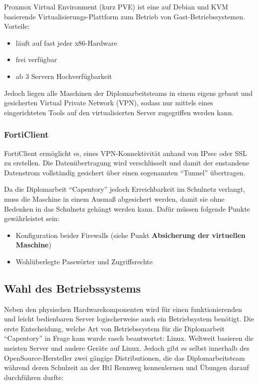 Proxmox Virtual Environment (kurz PVE) ist eine auf Debian und KVM
basierende Virtualisierungs-Plattform zum Betrieb von
Gast-Betriebssystemen. Vorteile:

\begin{itemize}
\tightlist
\item
  läuft auf fast jeder x86-Hardware
\item
  frei verfügbar
\item
  ab 3 Servern Hochverfügbarkeit
\end{itemize}

Jedoch liegen alle Maschinen der Diplomarbeitsteams in einem eigens
gebaut und gesicherten Virtual Private Network (VPN), sodass nur mittels
eines eingerichteten Tools auf den virtualisierten Server zugegriffen
werden kann.

\hypertarget{forticlient}{%
\subsubsection{FortiClient}\label{forticlient}}

FortiClient ermöglicht es, eines VPN-Konnektivität anhand von IPsec oder
SSL zu erstellen. Die Datenübertragung wird verschlüsselt und damit der
enstandene Datenstrom vollständig gesichert über einen sogenannten
``Tunnel'' übertragen.

Da die Diplomarbeit ``Capentory'' jedoch Erreichbarkeit im Schulnetz
verlangt, muss die Maschine in einem Ausmaß abgesichert werden, damit
sie ohne Bedenken in das Schulnetz gehängt werden kann. Dafür müssen
folgende Punkte gewährleistet sein:

\begin{itemize}
\tightlist
\item
  Konfiguration beider Firewalls (siehe Punkt \textbf{Absicherung der
  virtuellen Maschine})
\item
  Wohlüberlegte Passwörter und Zugriffsrechte
\end{itemize}

\hypertarget{wahl-des-betriebssystems}{%
\subsection{Wahl des Betriebssystems}\label{wahl-des-betriebssystems}}

Neben den physischen Hardwarekomponenten wird für einen funktionierenden
und leicht bedienbaren Server logischerweise auch ein Betriebsystem
benötigt. Die erste Entscheidung, welche Art von Betriebssystem für die
Diplomarbeit ``Capentory'' in Frage kam wurde rasch beantwortet: Linux.
Weltweit basieren die meisten Server und andere Geräte auf Linux. Jedoch
gibt es selbst innerhalb des OpenSource-Hersteller zwei gängige
Distributionen, die das Diplomarbeitsteam während deren Schulzeit an der
Htl Rennweg kennenlernen und Übungen darauf durchführen durfte:


